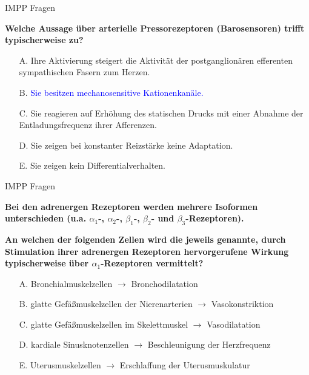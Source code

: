 \documentclass{beamer}
\begin{document}
\begin{frame}{IMPP Fragen}


\textbf{Welche Aussage über arterielle Pressorezeptoren (Barosensoren) trifft typischerweise zu?} \\[0.2 cm]

\begin{itemize}
\item[A.] Ihre Aktivierung steigert die Aktivität der postganglionären efferenten sympathischen Fasern zum Herzen.
\item[B.] \textcolor{blue}{Sie besitzen mechanosensitive Kationenkanäle.} %
\item[C.] Sie reagieren auf Erhöhung des statischen Drucks mit einer Abnahme der Entladungsfrequenz ihrer Afferenzen.
\item[D.] Sie zeigen bei konstanter Reizstärke keine Adaptation.
\item[E.] Sie zeigen kein Differentialverhalten.

\end{itemize}


\end{frame}




\begin{frame}{IMPP Fragen}


\textbf{Bei den adrenergen Rezeptoren werden mehrere Isoformen unterschieden (u.a. \(\alpha_1\)-, \(\alpha_2\)-, \(\beta_1\)-, \(\beta_2\)- und \(\beta_3\)-Rezeptoren). }

\textbf{An welchen der folgenden Zellen wird die jeweils genannte, durch Stimulation ihrer adrenergen Rezeptoren hervorgerufene Wirkung typischerweise über \(\alpha_1\)-Rezeptoren vermittelt?} \\[0.2 cm]

\begin{itemize}
\item[A.] Bronchialmuskelzellen \(\rightarrow\) Bronchodilatation
\item[B.] glatte Gefäßmuskelzellen der Nierenarterien \(\rightarrow\) Vasokonstriktion %
\item[C.]  glatte Gefäßmuskelzellen  im Skelettmuskel \(\rightarrow\) Vasodilatation
\item[D.]  kardiale Sinusknotenzellen \(\rightarrow\) Beschleunigung der Herzfrequenz
\item[E.] Uterusmuskelzellen \(\rightarrow\) Erschlaffung der Uterusmuskulatur 

\end{itemize}


\end{frame}
\end{document}
